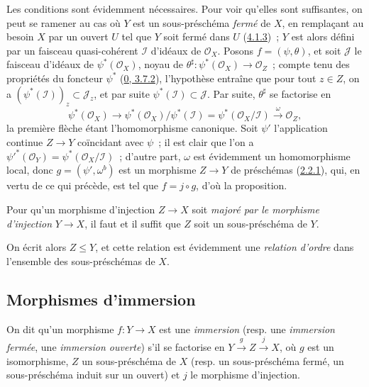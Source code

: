 Les conditions sont évidemment nécessaires. Pour voir qu'elles sont
suffisantes, on peut se ramener au cas où $Y$ est un sous-préschéma
\emph{fermé} de $X$, en remplaçant au besoin $X$ par un ouvert $U$ tel que
$Y$ soit fermé dans $U$ (\hyperref[I.4.1.3-fr]{4.1.3})~; $Y$ est alors défini
par un faisceau quasi-cohérent $\mathscr{I}$ d'idéaux de $\mathscr{O}_X$.
Posons $f=(\psi,\theta)$, et soit $\mathscr{J}$ le faisceau d'idéaux de
$\psi^*(\mathscr{O}_X)$, noyau de
$\theta^\sharp:\psi^*(\mathscr{O}_X)\to\mathscr{O}_Z$~; compte tenu des
propriétés du foncteur $\psi^*$ (\hyperref[0.3.7.2-fr]{0, 3.7.2}),
l'hypothèse entraîne que pour tout $z\in Z$, on a
$(\psi^*(\mathscr{I}))_z\subset\mathscr{J}_z$, et par suite
$\psi^*(\mathscr{I})\subset\mathscr{J}$. Par suite, $\theta^\sharp$ se
factorise en
\[
  \psi^*(\mathscr{O}_X)\longrightarrow
  \psi^*(\mathscr{O}_X)/\psi^*(\mathscr{I})
  =\psi^*(\mathscr{O}_X/\mathscr{I})
  \xrightarrow{\omega}\mathscr{O}_Z,
\]
la première flèche étant l'homomorphisme canonique. Soit $\psi'$ l'application
continue $Z\to Y$ coïncidant avec $\psi$~; il est clair que l'on a
${\psi'}^*(\mathscr{O}_Y)=\psi^*(\mathscr{O}_X/\mathscr{I})$~; d'autre part,
$\omega$ est évidemment un homomorphisme local, donc
$g=(\psi',\omega^b)$ est un morphisme $Z\to Y$
de préschémas (\hyperref[I.2.2.1-fr]{2.2.1}), qui, en vertu de ce qui précède,
est tel que $f=j\circ g$, d'où la proposition.

\begin{corollary}[4.1.10]
\label{I.4.1.10-fr}
Pour qu'un morphisme d'injection $Z\to X$ soit \emph{majoré par le morphisme
d'injection} $Y\to X$, il faut et il suffit que $Z$ soit un sous-préschéma de
$Y$.
\end{corollary}

On écrit alors $Z\leq Y$, et cette relation est évidemment une
\emph{relation d'ordre} dans l'ensemble des sous-préschémas de $X$.

\subsection{Morphismes d'immersion}
\label{subsection:I.4.2-fr}

\begin{definition}[4.2.1]
\label{I.4.2.1-fr}
On dit qu'un morphisme $f:Y\to X$ est une \emph{immersion} (resp. une
\emph{immersion fermée}, une \emph{immersion ouverte}) s'il se factorise en
$Y\xrightarrow{g}Z\xrightarrow{j}X$, où $g$ est un isomorphisme, $Z$ un
sous-préschéma de $X$ (resp. un sous-préschéma fermé, un sous-préschéma induit
sur un ouvert) et $j$ le morphisme d'injection.
\end{definition}

